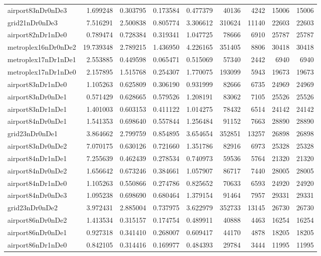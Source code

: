 \documentclass[../../../thesis.tex]{subfiles}
\begin{document}
\begin{longtable}{|l|r|r|r|r|r|r|r|r|}
airport83nDr0nDe3 & 1.699248 & 0.303795 & 0.173584 & 0.477379 & 40136 & 4242 & 15006 & 15006 \\
grid21nDr0nDe3 & 7.516291 & 2.500838 & 0.805774 & 3.306612 & 310624 & 11140 & 22603 & 22603 \\
airport82nDr1nDe0 & 0.789474 & 0.728384 & 0.319341 & 1.047725 & 78666 & 6910 & 25787 & 25787 \\
metroplex16nDr0nDe2 & 19.739348 & 2.789215 & 1.436950 & 4.226165 & 351405 & 8806 & 30418 & 30418 \\
metroplex17nDr1nDe1 & 2.553885 & 0.449598 & 0.065471 & 0.515069 & 57340 & 2442 & 6940 & 6940 \\
metroplex17nDr1nDe0 & 2.157895 & 1.515768 & 0.254307 & 1.770075 & 193099 & 5943 & 19673 & 19673 \\
airport83nDr1nDe0 & 1.105263 & 0.625809 & 0.306190 & 0.931999 & 82666 & 6735 & 24969 & 24969 \\
airport83nDr0nDe1 & 0.571429 & 0.628665 & 0.579526 & 1.208191 & 83062 & 7105 & 25526 & 25526 \\
airport83nDr1nDe1 & 1.401003 & 0.603153 & 0.411122 & 1.014275 & 78432 & 6514 & 24142 & 24142 \\
airport84nDr0nDe1 & 1.541353 & 0.698640 & 0.557844 & 1.256484 & 91152 & 7663 & 28890 & 28890 \\
grid23nDr0nDe1 & 3.864662 & 2.799759 & 0.854895 & 3.654654 & 352851 & 13257 & 26898 & 26898 \\
airport83nDr0nDe2 & 7.070175 & 0.630126 & 0.721660 & 1.351786 & 82916 & 6973 & 25328 & 25328 \\
airport84nDr1nDe1 & 7.255639 & 0.462439 & 0.278534 & 0.740973 & 59536 & 5764 & 21320 & 21320 \\
airport84nDr0nDe2 & 1.656642 & 0.673246 & 0.384661 & 1.057907 & 86717 & 7440 & 28005 & 28005 \\
airport84nDr1nDe0 & 1.105263 & 0.550866 & 0.274786 & 0.825652 & 70633 & 6593 & 24920 & 24920 \\
airport84nDr0nDe3 & 1.095238 & 0.698690 & 0.680464 & 1.379154 & 91464 & 7957 & 29331 & 29331 \\
grid23nDr0nDe2 & 3.972431 & 2.885004 & 0.737975 & 3.622979 & 352733 & 13145 & 26730 & 26730 \\
airport86nDr0nDe2 & 1.413534 & 0.315157 & 0.174754 & 0.489911 & 40888 & 4463 & 16254 & 16254 \\
airport86nDr0nDe1 & 0.927318 & 0.341410 & 0.268007 & 0.609417 & 44170 & 4878 & 18205 & 18205 \\
airport86nDr1nDe0 & 0.842105 & 0.314416 & 0.169977 & 0.484393 & 29784 & 3444 & 11995 & 11995 \\

\end{longtable}
\end{document}
